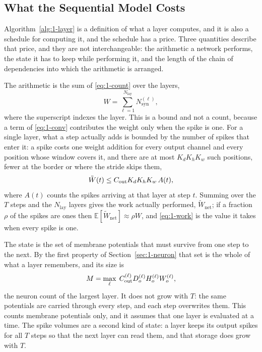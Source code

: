 \subsection{What the Sequential Model Costs}
\label{sec:1-cost}

Algorithm~\ref{alg:1-layer} is a definition of what a layer computes, and it is
also a schedule for computing it, and the schedule has a price. Three quantities
describe that price, and they are not interchangeable: the arithmetic a network
performs, the state it has to keep while performing it, and the length of the
chain of dependencies into which the arithmetic is arranged.

The arithmetic is the sum of \eqref{eq:1-count} over the layers,
\begin{equation}
W = \sum_{\ell=1}^{N_{\mathrm{lay}}} N_{\mathrm{syn}}^{(\ell)} ,
\label{eq:1-work}
\end{equation}
where the superscript indexes the layer. This is a bound and not a count,
because a term of \eqref{eq:1-conv} contributes the weight only when the spike is
one. For a single layer, what a step actually adds is bounded by the number of
spikes that enter it: a spike costs one weight addition for every output channel
and every position whose window covers it, and there are at most
$K_d K_h K_w$ such positions, fewer at the border or where the stride skips
them,
\begin{equation}
\tilde{W}(t) \le C_{\mathrm{out}} K_d K_h K_w \, A(t) ,
\label{eq:1-workt}
\end{equation}
where $A(t)$ counts the spikes arriving at that layer at step $t$. Summing over
the $T$ steps and the $N_{\mathrm{lay}}$ layers gives the work actually
performed, $\tilde{W}_{\mathrm{net}}$; if a fraction $\rho$ of the spikes are
ones then $\mathbb{E}[\tilde{W}_{\mathrm{net}}] \approx \rho W$, and
\eqref{eq:1-work} is the value it takes when every spike is one.

The state is the set of membrane potentials that must survive from one step to
the next. By the first property of Section~\ref{sec:1-neuron} that set is the
whole of what a layer remembers, and its size is
\begin{equation}
M = \max_{\ell}\; C_{\mathrm{out}}^{(\ell)} D_o^{(\ell)} H_o^{(\ell)} W_o^{(\ell)} ,
\label{eq:1-state}
\end{equation}
the neuron count of the largest layer. It does not grow with $T$: the same
potentials are carried through every step, and each step overwrites them. This
counts membrane potentials only, and it assumes that one layer is evaluated at a
time. The spike volumes are a second kind of state: a layer keeps its output
spikes for all $T$ steps so that the next layer can read them, and that storage
does grow with $T$.

